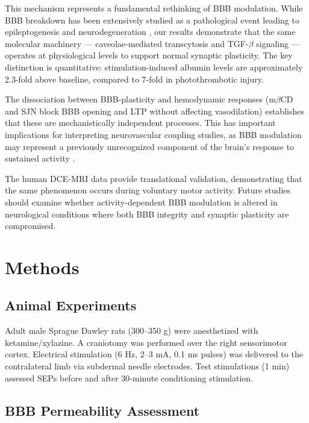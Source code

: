 \documentclass[11pt]{article}
\begin{document}
This mechanism represents a fundamental rethinking of BBB modulation. While BBB breakdown has been extensively studied as a pathological event leading to epileptogenesis and neurodegeneration \citep{friedman2009blood, seiffert2004lasting, heinemann2012blood}, our results demonstrate that the same molecular machinery --- caveolae-mediated transcytosis and TGF-$\beta$ signaling --- operates at physiological levels to support normal synaptic plasticity. The key distinction is quantitative: stimulation-induced albumin levels are approximately 2.3-fold above baseline, compared to 7-fold in photothrombotic injury.

The dissociation between BBB-plasticity and hemodynamic responses (m$\beta$CD and SJN block BBB opening and LTP without affecting vasodilation) establishes that these are mechanistically independent processes. This has important implications for interpreting neurovascular coupling studies, as BBB modulation may represent a previously unrecognized component of the brain's response to sustained activity \citep{attwell2010glial, iadecola2017neurovascular}.

The human DCE-MRI data provide translational validation, demonstrating that the same phenomenon occurs during voluntary motor activity. Future studies should examine whether activity-dependent BBB modulation is altered in neurological conditions where both BBB integrity and synaptic plasticity are compromised.

\section{Methods}

\subsection{Animal Experiments}

Adult male Sprague Dawley rats (300--350 g) were anesthetized with ketamine/xylazine. A craniotomy was performed over the right sensorimotor cortex. Electrical stimulation (6 Hz, 2--3 mA, 0.1 ms pulses) was delivered to the contralateral limb via subdermal needle electrodes. Test stimulations (1 min) assessed SEPs before and after 30-minute conditioning stimulation.

\subsection{BBB Permeability Assessment}
\end{document}

